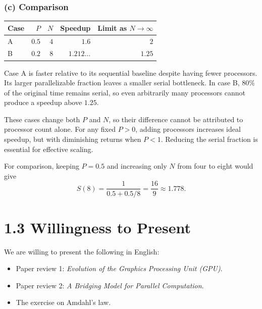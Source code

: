 \documentclass[11pt,a4paper]{article}
\begin{document}
\subsubsection*{(c) Comparison}
\begin{center}
\begin{tabular}{@{}lrrrr@{}}
\toprule
Case & $P$ & $N$ & Speedup & Limit as $N\to\infty$\\
\midrule
A & $0.5$ & $4$ & $1.6$ & $2$\\
B & $0.2$ & $8$ & $1.212\ldots$ & $1.25$\\
\bottomrule
\end{tabular}
\end{center}
Case A is faster relative to its sequential baseline despite having fewer
processors. Its larger parallelizable fraction leaves a smaller serial
bottleneck. In case B, $80\%$ of the original time remains serial, so even
arbitrarily many processors cannot produce a speedup above $1.25$.

These cases change both $P$ and $N$, so their difference cannot be attributed
to processor count alone. For any fixed $P>0$, adding processors increases
ideal speedup, but with diminishing returns when $P<1$.
Reducing the serial fraction is essential for effective scaling.

For comparison, keeping $P=0.5$ and increasing only $N$ from four to eight
would give
\[
  S(8)=\frac{1}{0.5+0.5/8}=\frac{16}{9}\approx1.778.
\]


\section*{1.3 Willingness to Present}
We are willing to present the following in English:
\begin{itemize}
  \item Paper review 1: \emph{Evolution of the Graphics Processing Unit (GPU)}.
  \item Paper review 2: \emph{A Bridging Model for Parallel Computation}.
  \item The exercise on Amdahl's law.
\end{itemize}
\end{document}
